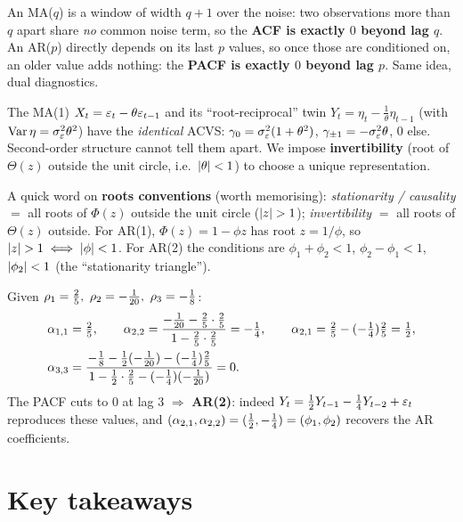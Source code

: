 \documentclass[11pt]{article}
\begin{document}
\begin{intu}
An MA($q$) is a window of width $q+1$ over the noise: two observations more than $q$ apart share \emph{no} common noise term, so the \textbf{ACF is exactly $0$ beyond lag $q$}. An AR($p$) directly depends on its last $p$ values, so once those are conditioned on, an older value adds nothing: the \textbf{PACF is exactly $0$ beyond lag $p$}. Same idea, dual diagnostics.
\end{intu}

\begin{intu}
The MA(1) $X_t=\varepsilon_t-\theta\varepsilon_{t-1}$ and its ``root-reciprocal'' twin $Y_t=\eta_t-\tfrac1\theta\eta_{t-1}$ (with $\operatorname{Var}\eta=\sigma_\varepsilon^2\theta^2$) have the \emph{identical} ACVS: $\gamma_0=\sigma_\varepsilon^2(1+\theta^2)$, $\gamma_{\pm1}=-\sigma_\varepsilon^2\theta$, $0$ else. Second-order structure cannot tell them apart. We impose \textbf{invertibility} (root of $\Theta(z)$ outside the unit circle, i.e.\ $\left\lvert \theta \right\rvert<1$) to choose a unique representation.
\end{intu}

A quick word on \textbf{roots conventions} (worth memorising): \emph{stationarity / causality} $=$ all roots of $\Phi(z)$ outside the unit circle ($\left\lvert z \right\rvert>1$); \emph{invertibility} $=$ all roots of $\Theta(z)$ outside. For AR(1), $\Phi(z)=1-\phi z$ has root $z=1/\phi$, so $\left\lvert z \right\rvert>1\iff\left\lvert \phi \right\rvert<1$. For AR(2) the conditions are $\phi_1+\phi_2<1$, $\phi_2-\phi_1<1$, $\left\lvert \phi_2 \right\rvert<1$ (the ``stationarity triangle'').

\begin{exmpl}
Given $\acf_1=\tfrac25,\ \acf_2=-\tfrac1{20},\ \acf_3=-\tfrac18$:
\[
\begin{aligned}
\alpha_{1,1}&=\tfrac25,\qquad
\alpha_{2,2}=\frac{-\frac1{20}-\frac25\cdot\frac25}{1-\frac25\cdot\frac25}=-\tfrac14,\qquad
\alpha_{2,1}=\tfrac25-(-\tfrac14)\tfrac25=\tfrac12,\\
\alpha_{3,3}&=\frac{-\frac18-\frac12(-\frac1{20})-(-\frac14)\frac25}{\,1-\frac12\cdot\frac25-(-\frac14)(-\frac1{20})\,}=0 .
\end{aligned}
\]
The PACF cuts to $0$ at lag $3$ $\Rightarrow$ \textbf{AR(2)}: indeed $Y_t=\tfrac12Y_{t-1}-\tfrac14Y_{t-2}+\varepsilon_t$ reproduces these values, and $(\alpha_{2,1},\alpha_{2,2})=(\tfrac12,-\tfrac14)=(\phi_1,\phi_2)$ recovers the AR coefficients.
\end{exmpl}

\section*{Key takeaways}
\end{document}
